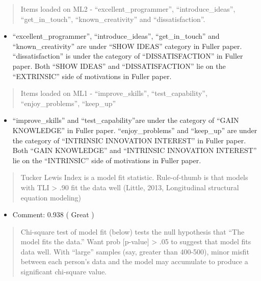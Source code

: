\documentclass[
]{article}
\providecommand{\tightlist}{%
  \setlength{\itemsep}{0pt}\setlength{\parskip}{0pt}}
\begin{document}
\begin{quote}
Items loaded on ML2 - ``excellent\_programmer'', ``introduce\_ideas'',
``get\_in\_touch'', ``known\_creativity'' and ``dissatisfaction''.
\end{quote}

\begin{itemize}
\tightlist
\item
  ``excellent\_programmer'', ``introduce\_ideas'', ``get\_in\_touch''
  and ``known\_creativity'' are under ``SHOW IDEAS'' category in Fuller
  paper. ``dissatisfaction'' is under the category of
  ``DISSATISFACTION'' in Fuller paper. Both ``SHOW IDEAS'' and
  ``DISSATISFACTION'' lie on the ``EXTRINSIC'' side of motivations in
  Fuller paper.
\end{itemize}

\begin{quote}
Items loaded on ML1 - ``improve\_skills'', ``test\_capability'',
``enjoy\_problems'', ``keep\_up''
\end{quote}

\begin{itemize}
\tightlist
\item
  ``improve\_skills'' and ``test\_capability''are under the category of
  ``GAIN KNOWLEDGE'' in Fuller paper. ``enjoy\_problems'' and
  ``keep\_up'' are under the category of ``INTRINSIC INNOVATION
  INTEREST'' in Fuller paper. Both ``GAIN KNOWLEDGE'' and ``INTRINSIC
  INNOVATION INTEREST'' lie on the ``INTRINSIC'' side of motivations in
  Fuller paper.
\end{itemize}

\begin{quote}
Tucker Lewis Index is a model fit statistic. Rule-of-thumb is that
models with TLI \textgreater{} .90 fit the data well (Little, 2013,
Longitudinal structural equation modeling)
\end{quote}

\begin{itemize}
\tightlist
\item
  Comment: 0.938 ( Great )
\end{itemize}

\begin{quote}
Chi-square test of model fit (below) tests the null hypothesis that
``The model fits the data.'' Want prob {[}p-value{]} \textgreater{} .05
to suggest that model fits data well. With ``large'' samples (say,
greater than 400-500), minor misfit between each person's data and the
model may accumulate to produce a significant chi-square value.
\end{quote}
\end{document}
